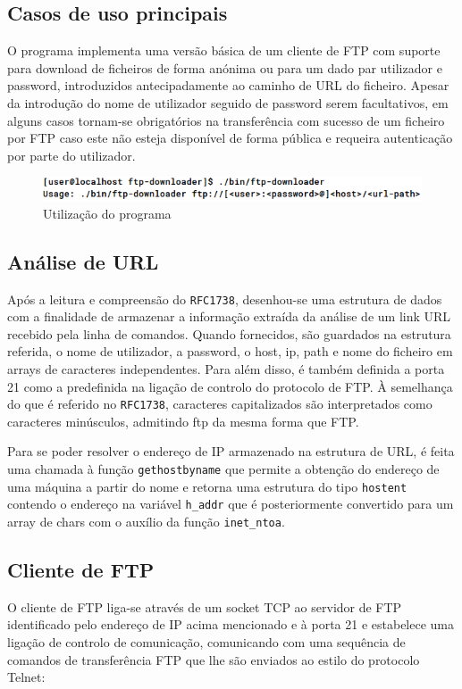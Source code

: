 \documentclass[a4paper,11pt,titlepage]{article}
\begin{document}
\subsection*{Casos de uso principais}

O programa implementa uma versão básica de um cliente de FTP com suporte para
download de ficheiros de forma anónima ou para um dado par utilizador e
password, introduzidos antecipadamente ao caminho de URL do ficheiro.  Apesar
da introdução do nome de utilizador seguido de password serem facultativos, em
alguns casos tornam-se obrigatórios na transferência com sucesso de um ficheiro
por FTP caso este não esteja disponível de forma pública e requeira
autenticação por parte do utilizador.

\begin{figure}[H]
    \center
    \includegraphics[scale=0.6]{res/usage.png}
    \caption{Utilização do programa}
    \label{fig:usage.png}
\end{figure}

\subsection*{Análise de URL}
Após a leitura e compreensão do \texttt{RFC1738}, desenhou-se uma estrutura de
dados com a finalidade de armazenar a informação extraída da análise de um link
URL recebido pela linha de comandos. Quando fornecidos, são guardados na
estrutura referida, o nome de utilizador, a password, o host, ip, path e nome
do ficheiro em arrays de caracteres independentes. Para além disso, é também
definida a porta 21 como a predefinida na ligação de controlo do protocolo de
FTP. À semelhança do que é referido no \texttt{RFC1738}, caracteres
capitalizados são interpretados como caracteres minúsculos, admitindo ftp da
mesma forma que FTP.

Para se poder resolver o endereço de IP armazenado na estrutura de URL, é feita
uma chamada à função \texttt{gethostbyname} que permite a obtenção do endereço
de uma máquina a partir do nome e retorna uma estrutura do tipo
\texttt{hostent} contendo o endereço na variável \texttt{h\_addr} que é
posteriormente convertido para um array de chars com o auxílio da função
\texttt{inet\_ntoa}.

\subsection*{Cliente de FTP}
O cliente de FTP liga-se através de um socket TCP ao servidor de FTP
identificado pelo endereço de IP acima mencionado e à porta 21 e estabelece uma
ligação de controlo de comunicação, comunicando com uma sequência de comandos
de transferência FTP que lhe são enviados ao estilo do protocolo Telnet: 
\end{document}
